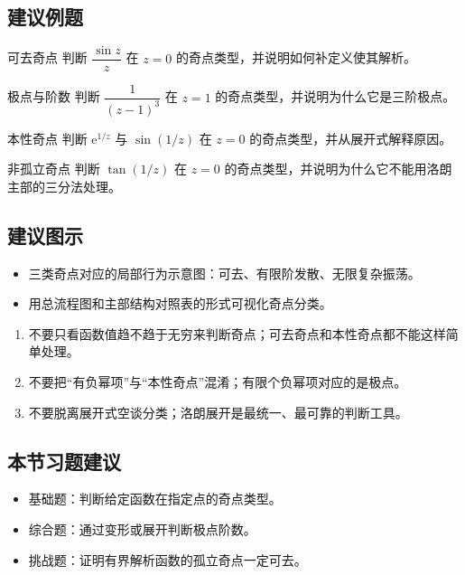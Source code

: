 \subsection*{建议例题}
\begin{lizi}{可去奇点}{}
判断 $\dfrac{\sin z}{z}$ 在 $z=0$ 的奇点类型，并说明如何补定义使其解析。
\end{lizi}

\begin{lizi}{极点与阶数}{}
判断 $\dfrac{1}{(z-1)^3}$ 在 $z=1$ 的奇点类型，并说明为什么它是三阶极点。
\end{lizi}

\begin{lizi}{本性奇点}{}
判断 $\mathrm{e}^{1/z}$ 与 $\sin(1/z)$ 在 $z=0$ 的奇点类型，并从展开式解释原因。
\end{lizi}

\begin{lizi}{非孤立奇点}{}
判断 $\tan(1/z)$ 在 $z=0$ 的奇点类型，并说明为什么它不能用洛朗主部的三分法处理。
\end{lizi}

\subsection*{建议图示}
\begin{itemize}
    \item 三类奇点对应的局部行为示意图：可去、有限阶发散、无限复杂振荡。
    \item 用总流程图和主部结构对照表的形式可视化奇点分类。
\end{itemize}

\begin{jinshi}[本节易错点]
\begin{enumerate}
    \item 不要只看函数值趋不趋于无穷来判断奇点；可去奇点和本性奇点都不能这样简单处理。
    \item 不要把``有负幂项''与``本性奇点''混淆；有限个负幂项对应的是极点。
    \item 不要脱离展开式空谈分类；洛朗展开是最统一、最可靠的判断工具。
\end{enumerate}
\end{jinshi}

\subsection*{本节习题建议}
\begin{itemize}
    \item 基础题：判断给定函数在指定点的奇点类型。
    \item 综合题：通过变形或展开判断极点阶数。
    \item 挑战题：证明有界解析函数的孤立奇点一定可去。
\end{itemize}

